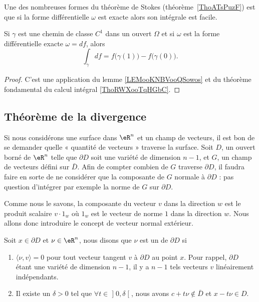 Une des nombreuses formes du théorème de Stokes (théorème~\ref{ThoATsPuzF}) est que si la forme différentielle \( \omega\) est exacte alors son intégrale est facile.
\begin{theorem} \label{ThoUJMhFwU}
	Si \( \gamma\) est une chemin de classe \( C^1\) dans un ouvert \( \Omega\) et si \( \omega\) est la forme différentielle exacte \( \omega=df\), alors
	\begin{equation}
		\int_{\gamma}df=f\big( \gamma(1) \big)-f\big( \gamma(0) \big).
	\end{equation}
\end{theorem}

\begin{proof}
	C'est une application du lemme \ref{LEMooKNBVooQSowos} et du théorème fondamental du calcul intégral \ref{ThoRWXooTqHGbC}.
\end{proof}

\subsection{Théorème de la divergence}

Si nous considérons une surface dans \( \eR^n\) et un champ de vecteurs, il est bon de se demander quelle « quantité de vecteurs » traverse la surface. Soit \( D\), un ouvert borné de \( \eR^n\) telle que \( \partial D\) soit une variété de dimension \( n-1\), et \( G\), un champ de vecteurs défini sur \( \bar D\). Afin de compter combien de \( G\) traverse \( \partial D\), il faudra faire en sorte de ne considérer que la composante de \( G\) normale à \( \partial D\) : pas question d'intégrer par exemple la norme de \( G\) sur \( \partial D\).

Comme nous le savons, la composante du vecteur \( v\) dans la direction \( w\) est le produit scalaire \( v\cdot 1_w\) où \( 1_w\) est le vecteur de norme \( 1\) dans la direction \( w\). Nous allons donc introduire le concept de vecteur normal extérieur.

\begin{definition}
	Soit \( x\in\partial D\) et \( \nu\in\eR^n\), nous disons que \( \nu\) est un  de \( \partial D\) si
	\begin{enumerate}

		\item
		      \( \langle \nu, v\rangle =0\) pour tout vecteur tangent \( v\) à \( \partial D\) au point \( x\). Pour rappel, \( \partial D\) étant une variété de dimension \( n-1\), il y a \( n-1\) tels vecteurs \( v\) linéairement indépendants.

		\item
		      Il existe un \( \delta>0\) tel que \( \forall t\in\mathopen] 0 , \delta \mathclose[\), nous avons \( c+t\nu\notin \bar D\) et \( x-t\nu\in D\).
	\end{enumerate}
\end{definition}

